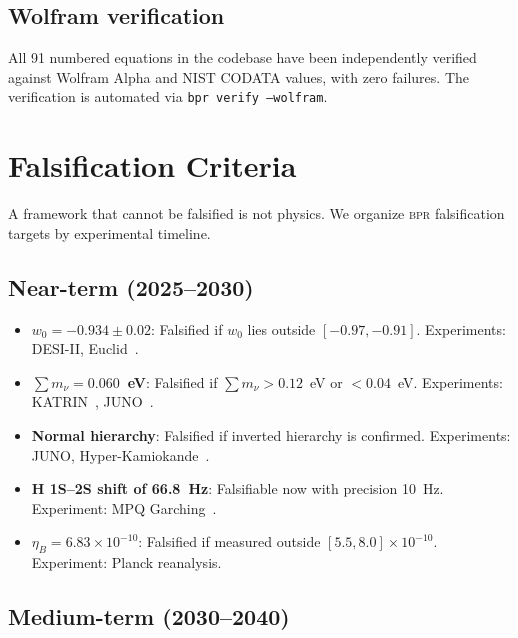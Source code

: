 \documentclass[aps,prd,twocolumn,superscriptaddress,longbibliography,nofootinbib]{revtex4-2}
\newcommand{\bpr}{\textsc{bpr}}
\begin{document}
\subsection{Wolfram verification}

All 91 numbered equations in the codebase have been independently
verified against Wolfram Alpha and NIST CODATA values, with zero
failures.  The verification is automated via \texttt{bpr verify
--wolfram}.


\section{Falsification Criteria}
\label{sec:falsification}

A framework that cannot be falsified is not physics.  We organize
\bpr{} falsification targets by experimental timeline.

\subsection{Near-term (2025--2030)}

\begin{itemize}
\item \textbf{$w_0 = -0.934 \pm 0.02$}: Falsified if $w_0$ lies
  outside $[-0.97, -0.91]$.  Experiments: DESI-II,
  Euclid~\cite{Euclid2024}.

\item \textbf{$\sum m_\nu = 0.060$~eV}: Falsified if $\sum m_\nu
  > 0.12$~eV or $< 0.04$~eV.  Experiments: KATRIN~\cite{KATRIN2022},
  JUNO~\cite{JUNO2022}.

\item \textbf{Normal hierarchy}: Falsified if inverted hierarchy is
  confirmed.  Experiments: JUNO, Hyper-Kamiokande~\cite{HyperK2018}.

\item \textbf{H 1S--2S shift of 66.8~Hz}: Falsifiable now with
  precision 10~Hz.  Experiment: MPQ Garching~\cite{Parthey2011}.

\item \textbf{$\eta_B = 6.83 \times 10^{-10}$}: Falsified if
  measured outside $[5.5, 8.0] \times 10^{-10}$.  Experiment:
  Planck reanalysis.
\end{itemize}

\subsection{Medium-term (2030--2040)}
\end{document}
